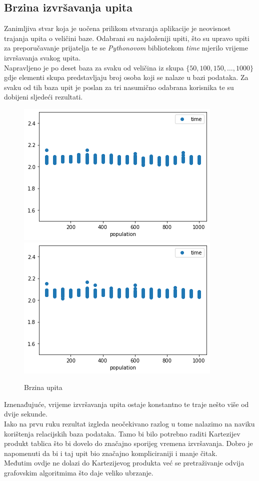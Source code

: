 \documentclass[titlepage, 12pt]{scrartcl}
\begin{document}
	\subsection{Brzina izvršavanja upita}
	Zanimljiva stvar koja je uočena prilikom stvaranja aplikacije je neovisnost trajanja upita o veličini baze. Odabrani su najsloženiji upiti, što su upravo upiti za preporučavanje prijatelja te se \emph{Pythonovom} bibliotekom \emph{time} mjerilo vrijeme izvršavanja svakog upita. \\
	Napravljeno je po deset baza za svaku od veličina iz skupa $\{50, 100, 150, \dots, 1000\}$ gdje elementi skupa predstavljaju broj osoba koji se nalaze u bazi podataka. Za svaku od tih baza upit je poslan za tri nasumično odabrana korisnika te su dobijeni sljedeći rezultati.\\
	
	\begin{figure}[h]
		\centering
		\includegraphics[scale=0.5]{slike/personal_graph.png}
		\includegraphics[scale=0.5]{slike/business_graph.png}
		\caption{Brzina upita}
		\label{fig:query_speed}
	\end{figure}
	
	
	Iznenađujuće, vrijeme izvršavanja upita ostaje konstantno te traje nešto više od dvije sekunde. \\
	Iako na prvu ruku rezultat izgleda neočekivano razlog u tome nalazimo na naviku korištenja relacijskih baza podataka. Tamo bi bilo potrebno raditi Kartezijev produkt tablica što bi dovelo do značajno sporijeg vremena izvršavanja. Dobro je napomenuti da bi i taj upit bio značajno kompliciraniji i manje čitak. \\
	Međutim ovdje ne dolazi do Kartezijevog produkta već se pretraživanje odvija grafovskim algoritmima što daje veliko ubrzanje.
	
\end{document}
